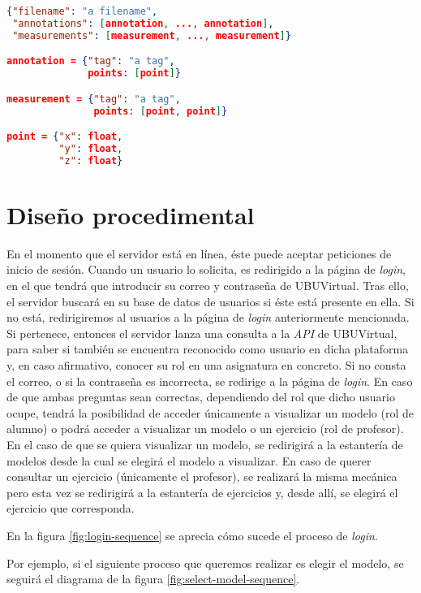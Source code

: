 \begin{lstlisting}[language=json, float, caption=Esquema JSON, label=JSON-schema]
{"filename": "a filename",
 "annotations": [annotation, ..., annotation],
 "measurements": [measurement, ..., measurement]}

annotation = {"tag": "a tag",
			  points: [point]}

measurement = {"tag": "a tag",
			   points: [point, point]}

point = {"x": float,
		 "y": float,
		 "z": float}
\end{lstlisting}

\section{Diseño procedimental}\label{sec:diseño-procedimental}
En el momento que el servidor está en línea, éste puede aceptar peticiones de inicio de sesión. Cuando un usuario lo solicita, es redirigido a la página de \textit{login}, en el que tendrá que introducir su correo y contraseña de UBUVirtual. Tras ello, el servidor buscará en su base de datos de usuarios si éste está presente en ella. Si no está, redirigiremos al usuarios a la página de \textit{login} anteriormente mencionada. Si pertenece, entonces el servidor lanza una consulta a la \textit{API} de UBUVirtual, para saber si también se encuentra reconocido como usuario en dicha plataforma y, en caso afirmativo, conocer su rol en una asignatura en concreto. Si no consta el correo, o si la contraseña es incorrecta, se redirige a la página de \textit{login}. En caso de que ambas preguntas sean correctas, dependiendo del rol que dicho usuario ocupe, tendrá la posibilidad de acceder únicamente a visualizar un modelo (rol de alumno) o podrá acceder a visualizar un modelo o un ejercicio (rol de profesor). En el caso de que se quiera visualizar un modelo, se redirigirá a la estantería de modelos desde la cual se elegirá el modelo a visualizar. En caso de querer consultar un ejercicio (únicamente el profesor), se realizará la misma mecánica pero esta vez se redirigirá a la estantería de ejercicios y, desde allí, se elegirá el ejercicio que corresponda.

En la figura \ref{fig:login-sequence} se aprecia cómo sucede el proceso de \textit{login}.

Por ejemplo, si el siguiente proceso que queremos realizar es elegir el modelo, se seguirá el diagrama de la figura \ref{fig:select-model-sequence}.

